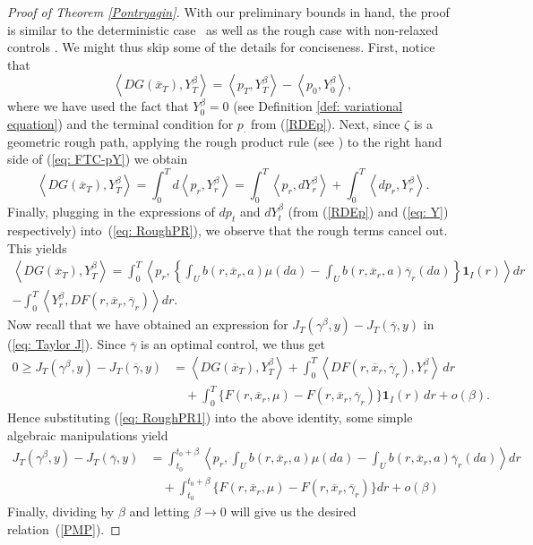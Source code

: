 \documentclass[12pt,reqno]{amsart}
\numberwithin{equation}{section}  %
\newcommand{\1}{{\bf 1}}
\newcommand{\2}{{\bf 2}}
\newcommand{\ga}{\gamma}
\theoremstyle{remark}
\theoremstyle{remark}
\begin{document}
\begin{proof}[Proof of Theorem \ref{Pontryagin}]
With our preliminary bounds in hand, the proof is similar to the deterministic case~\cite{yong-zhou} as well as the rough case with non-relaxed controls \cite{diehl}. We might thus skip some of the details for conciseness. First, notice that
\begin{equation}\label{eq: FTC-pY}
\left<DG(\bar{x}_{T}),Y_{T}^{\beta} \right>=\left<p_{T},Y_{T}^{\beta} \right> -\left<p_{0},Y_{0}^{\beta} \right>,
\end{equation}
where we have used the fact that $Y_{0}^{\beta}=0$ (see Definition \ref{def: variational equation}) and the terminal condition for $p_{\cdot}$ from (\ref{RDEp}).
Next, since $\zeta$ is a geometric rough path, applying the rough product rule (see \cite[Theorem 7.7]{MR4174393}) to the right hand side of (\ref{eq: FTC-pY}) we obtain
\begin{equation}\label{eq: RoughPR}
    \left< DG(\overline{x}_{T}),Y_{T}^{\beta} \right> =\int_{0}^{T}d\left<p_{r},Y_{r}^{\beta} \right>
    =\int_{0}^{T}\left<p_{r},dY_{r}^{\beta} \right>+\int_{0}^{T}\left<dp_{r},Y_{r}^{\beta} \right>.
\end{equation}
Finally, plugging in the expressions of $dp_{t}$ and $dY_{t}^{\beta}$ (from (\ref{RDEp}) and (\ref{eq: Y}) respectively) into~(\ref{eq: RoughPR}), we observe that the rough terms cancel out. This yields
\begin{multline}\label{eq: RoughPR1}
    \left<DG(\overline{x}_{T}),Y_{T}^{\beta} \right>=\int_{0}^{T}\left <p_{r},\left\{\int_{U}b(r,\overline{x}_{r},a)\mu(da)-\int_{U}b(r,\overline{x}_{r},a)\overline{\gamma}_{r}(da) \right\}\mathbf{1}_{I}(r) \right>dr\\-\int_{0}^{T}\left<Y_{r}^{\beta},DF(r,\overline{x}_{r},\overline{\gamma}_{r}) \right>dr .
\end{multline}
Now recall that we have obtained an expression for $J_{T}(\ga^{\beta},y)-J_{T}(\overline{\ga},y)$ in (\ref{eq: Taylor J}). Since $\overline{\ga}$ is an optimal control, we thus get
\begin{align*}
0 \geq J_{T}(\gamma^{\beta},y)-J_{T}({\overline\gamma},y)&=\left<DG(\overline{x}_{T}),Y_{T}^{\beta} \right>+\int_{0}^{T} \left<DF(r,\overline{x}_{r},\overline{\gamma}_{r}),Y_{r}^{\beta}\right>\, dr \\ & \quad+ \int_{0}^{T}\{F(r,\overline{x}_{r},\mu)-F(r,\overline{x}_{r},\overline{\gamma}_{r})\}\mathbf{1}_{I}(r)\,dr +o(\beta).
\end{align*}
Hence substituting (\ref{eq: RoughPR1}) into the above identity, some simple algebraic manipulations yield
\begin{align*}
  J_{T}(\ga^{\beta},y)-J_{T}(\overline{\ga},y)  &= \int_{t_{0}}^{t_{0}+\beta}\left <p_{r},\int_{U}b(r,\overline{x}_{r},a)\mu(da)-\int_{U}b(r,\overline{x}_{r},a)\overline{\gamma}_{r}(da)\right>dr\\
    &\quad + \int_{t_{0}}^{t_{0}+\beta}\{F(r,\overline{x}_{r},\mu)-F(r,\overline{x}_{r},\overline{\gamma}_{r})\}dr +o(\beta)
\end{align*}
Finally, dividing by $\beta$ and letting $\beta \to 0$ will give us the desired relation~(\ref{PMP}).\end{proof}
\end{document}
